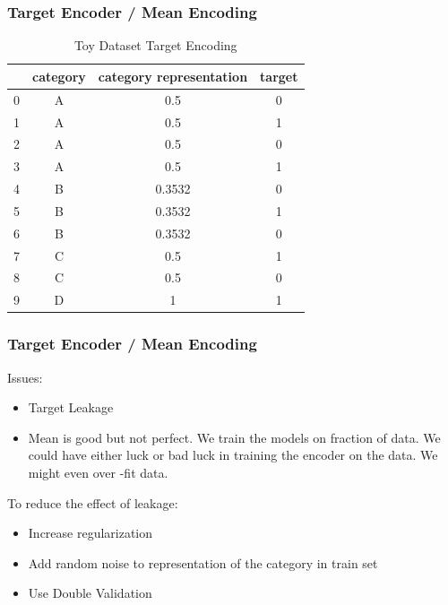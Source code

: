 \documentclass{beamer}
\begin{document}
    \begin{frame}
        \frametitle{Target Encoder / Mean Encoding}
        \begin{table}[htb]
            \begin{center}
            {\renewcommand{\arraystretch}{0.4}
            \renewcommand{\tabcolsep}{0.4cm}
                \begin{tabular}[c]{|c|c|c|c|}
                    \hline & \textbf{category} & \textbf{category representation} & \textbf{
                        target} \\
                    \hline
                    0 & A & 0.5    & 0 \\
                    \hline
                    1 & A & 0.5    & 1 \\
                    \hline
                    2 & A & 0.5    & 0 \\
                    \hline
                    3 & A & 0.5    & 1 \\
                    \hline
                    4 & B & 0.3532 & 0 \\
                    \hline
                    5 & B & 0.3532 & 1 \\
                    \hline
                    6 & B & 0.3532 & 0 \\
                    \hline
                    7 & C & 0.5    & 1 \\
                    \hline
                    8 & C & 0.5    & 0 \\
                    \hline
                    9 & D & 1      & 1 \\
                    \hline
                \end{tabular}}
                \caption{Toy Dataset Target Encoding}
            \end{center}
        \end{table}
    \end{frame}

    \begin{frame}[fragile]
        \frametitle{Target Encoder / Mean Encoding}
        Issues:
        \begin{itemize}
            \item Target Leakage
            \pause
            \item Mean is good but not perfect. We train the models on fraction of data. We could
            have either luck or bad luck in training the encoder on the data. We might even over
            -fit data.
            \pause
        \end{itemize}
        To reduce the effect of leakage:
        \begin{itemize}
            \item Increase regularization
            \pause
            \item Add random noise to representation of the category in train set
            \pause
            \item Use Double Validation
        \end{itemize}
    \end{frame}
\end{document}
